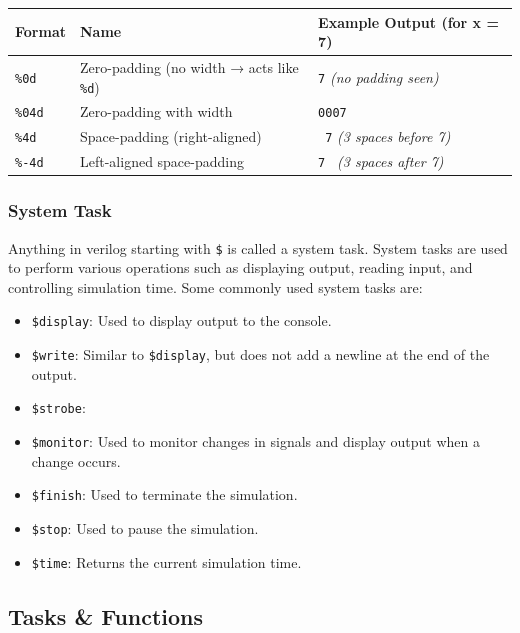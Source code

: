 \documentclass[12pt, a4paper]{article}
\begin{document}
\begin{center}
\begin{tabular}{|l|l|p{}|}
\hline
\textbf{Format} & \textbf{Name} & \textbf{Example Output (for x = 7)} \\
\hline
\texttt{\%0d} & Zero-padding (no width → acts like \texttt{\%d}) & \texttt{7} \textit{(no padding seen)} \\
\hline
\texttt{\%04d} & Zero-padding with width & \texttt{0007} \\
\hline
\texttt{\%4d} & Space-padding (right-aligned) & \texttt{   7} \textit{(3 spaces before 7)} \\
\hline
\texttt{\%-4d} & Left-aligned space-padding & \texttt{7   } \textit{(3 spaces after 7)} \\
\hline
\end{tabular}
\end{center}

\subsubsection{System Task}

Anything in verilog starting with \texttt{\$} is called a system task. System tasks are used to perform various operations such as displaying output, reading input, and controlling simulation time. Some commonly used system tasks are:

\begin{itemize}
    \item \texttt{\$display}: Used to display output to the console.
    \item \texttt{\$write}: Similar to \texttt{\$display}, but does not add a newline at the end of the output.
    \item \texttt{\$strobe}: 
    \item \texttt{\$monitor}: Used to monitor changes in signals and display output when a change occurs.
    \item \texttt{\$finish}: Used to terminate the simulation.
    \item \texttt{\$stop}: Used to pause the simulation.
    \item \texttt{\$time}: Returns the current simulation time.
\end{itemize}

\subsection{Tasks \& Functions}
\end{document}
